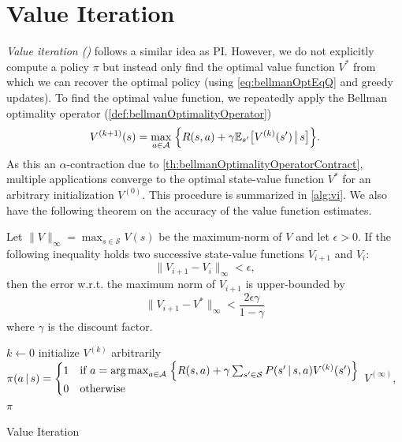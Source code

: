	\section{Value Iteration}
		\emph{Value iteration ()} follows a similar idea as \ac{PI}. However, we do not explicitly compute a policy \(\pi\) but instead only find the optimal value function \(V^\ast\) from which we can recover the optimal policy (using \eqref{eq:bellmanOptEqQ} and greedy updates). To find the optimal value function, we repeatedly apply the Bellman optimality operator (\autoref{def:bellmanOptimalityOperator})
		\begin{equation}
			V^{(k + 1)}(s) = \max_{a \in \mathcal{A}} \;\Bigl\{ R(s, a) + \gamma \mathbb{E}_{s'}\bigl[ V^{(k)}(s') \,\big\vert\, s \bigr] \Bigr\}.
		\end{equation}
		As this an \(\alpha\)-contraction due to \autoref{th:bellmanOptimalityOperatorContract}, multiple applications converge to the optimal state-value function \(V^\ast\) for an arbitrary initialization \(V^{(0)}\). This procedure is summarized in \autoref{alg:vi}. We also have the following theorem on the accuracy of the value function estimates.

		\begin{theorem}
			Let \( \lVert V \rVert_\infty = \max_{s \in \mathcal{S}} V(s) \) be the maximum-norm of \(V\) and let \(\epsilon > 0\). If the following inequality holds two successive state-value functions \( V_{i + 1} \) and \( V_i \):
			\begin{equation}
				\lVert V_{i + 1} - V_i \rVert_\infty < \epsilon,
			\end{equation}
			then the error w.r.t. the maximum norm of \(V_{i + 1}\) is upper-bounded by
			\begin{equation}
				\lVert V_{i + 1} - V^\ast \rVert_\infty < \frac{2 \epsilon \gamma}{1 - \gamma}
			\end{equation}
			where \(\gamma\) is the discount factor.
		\end{theorem}

		\begin{algorithm}  \DontPrintSemicolon
			\( k \gets 0 \) \;
			initialize \( V^{(k)} \) arbitrarily \;
			\(
				\pi(a \,\vert\, s) =
					\begin{cases}
						1 & \text{if }a = \operatorname*{arg\,max}_{a \in \mathcal{A}} \;\Bigl\{ R(s, a) + \gamma \sum_{s' \in \mathcal{S}} P(s' \,\vert\, s, a) V^{(k)}(s') \Bigr\} \\
						0 & \text{otherwise}
					\end{cases}
			\) \;
			\Return \( V^{(\infty)} \), \( \pi \)
			\caption{Value Iteration}
			\label{alg:vi}
		\end{algorithm}

